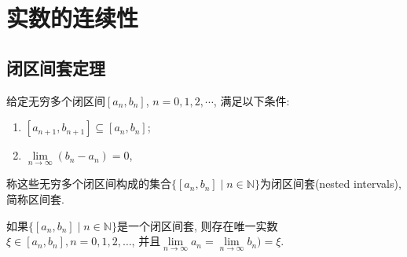 \chapter{实数的连续性}
\section{闭区间套定理}
\begin{definition}
	给定无穷多个闭区间$[a_n,b_n]$, $n=0,1,2,\cdots$, 满足以下条件:
	\begin{enumerate}[itemindent=1em]
		\item $[a_{n+1},b_{n+1}]\subseteq[a_n,b_n]$;
		\item $\lim \limits_{n\rightarrow \infty}(b_n-a_n)=0$,
	\end{enumerate}
	称这些无穷多个闭区间构成的集合$\{[a_n,b_n]\mid n\in \mathbb N\}$为闭区间套(nested intervals), 简称区间套.
\end{definition}

\begin{theorem}[闭区间套定理]
	如果$\{[a_n,b_n]\mid n\in \mathbb N\}$是一个闭区间套, 则存在唯一实数$\xi \in [a_n,b_n], n=0,1,2,\ldots$, 并且$\lim \limits_{n\rightarrow \infty}a_n=\lim \limits_{n\rightarrow \infty}b_n)=\xi$.
\end{theorem}

